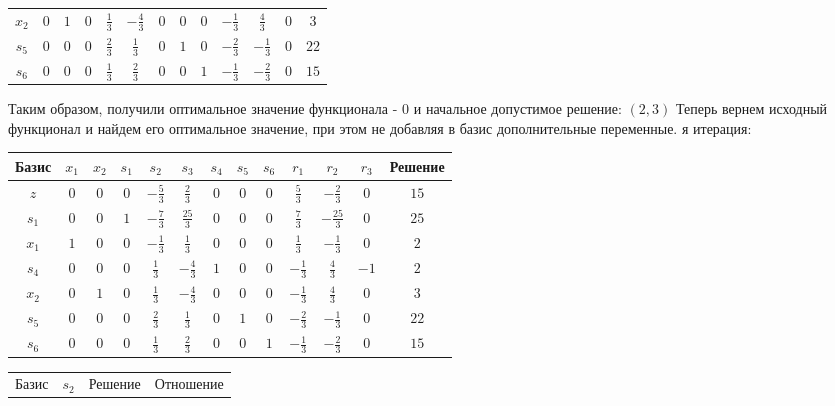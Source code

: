\documentclass{article}%
\begin{document}
\begin{flushleft}
\begin{tabular}{|c|ccccccccccc|c|}
$x_{2}$&$0$&$1$&$0$&$\frac{1}{3}$&$-\frac{4}{3}$&$0$&$0$&$0$&$-\frac{1}{3}$&$\frac{4}{3}$&$0$&$3$\\%
$s_{5}$&$0$&$0$&$0$&$\frac{2}{3}$&$\frac{1}{3}$&$0$&$1$&$0$&$-\frac{2}{3}$&$-\frac{1}{3}$&$0$&$22$\\%
$s_{6}$&$0$&$0$&$0$&$\frac{1}{3}$&$\frac{2}{3}$&$0$&$0$&$1$&$-\frac{1}{3}$&$-\frac{2}{3}$&$0$&$15$\\%
\hline%
\end{tabular}%
\newline%
\newline%
Таким образом, получили оптимальное значение функционала {-} 0 и начальное допустимое решение: %
$(2, 3)$%
\newline%
Теперь вернем исходный функционал и найдем его оптимальное значение, при этом не добавляя в базис дополнительные переменные.%
я итерация: %
\newline%
\newline%
\renewcommand{\arraystretch}{1.3}%
\begin{tabular}{|c|ccccccccccc|c|}%
\hline%
Базис&$x_{1}$&$x_{2}$&$s_{1}$&$s_{2}$&$s_{3}$&$s_{4}$&$s_{5}$&$s_{6}$&$r_{1}$&$r_{2}$&$r_{3}$&Решение\\%
\hline%
$z$&$0$&$0$&$0$&$-\frac{5}{3}$&$\frac{2}{3}$&$0$&$0$&$0$&$\frac{5}{3}$&$-\frac{2}{3}$&$0$&$15$\\%
\hline%
$s_{1}$&$0$&$0$&$1$&$-\frac{7}{3}$&$\frac{25}{3}$&$0$&$0$&$0$&$\frac{7}{3}$&$-\frac{25}{3}$&$0$&$25$\\%
$x_{1}$&$1$&$0$&$0$&$-\frac{1}{3}$&$\frac{1}{3}$&$0$&$0$&$0$&$\frac{1}{3}$&$-\frac{1}{3}$&$0$&$2$\\%
$s_{4}$&$0$&$0$&$0$&$\frac{1}{3}$&$-\frac{4}{3}$&$1$&$0$&$0$&$-\frac{1}{3}$&$\frac{4}{3}$&$-1$&$2$\\%
$x_{2}$&$0$&$1$&$0$&$\frac{1}{3}$&$-\frac{4}{3}$&$0$&$0$&$0$&$-\frac{1}{3}$&$\frac{4}{3}$&$0$&$3$\\%
$s_{5}$&$0$&$0$&$0$&$\frac{2}{3}$&$\frac{1}{3}$&$0$&$1$&$0$&$-\frac{2}{3}$&$-\frac{1}{3}$&$0$&$22$\\%
$s_{6}$&$0$&$0$&$0$&$\frac{1}{3}$&$\frac{2}{3}$&$0$&$0$&$1$&$-\frac{1}{3}$&$-\frac{2}{3}$&$0$&$15$\\%
\hline%
\end{tabular}%
\newline%
\newline%
\newline%
\begin{tabular}{|cccc|}%
\hline%
Базис&$s_{2}$&Решение&Отношение\\%

\end{tabular}
\end{flushleft}
\end{document}
